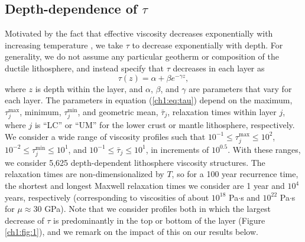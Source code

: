 \subsection{Depth-dependence of $\tau$}
Motivated by the fact that effective viscosity decreases exponentially
with increasing temperature \citep[e.g.,][]{Kohlstedt1995}, we take
$\tau$ to decrease exponentially with depth. For generality, we do not
assume any particular geotherm or composition of the ductile
lithosphere, and instead specify that $\tau$ decreases in each layer
as
\begin{equation}
\tau(z) = \alpha + \beta e^{-\gamma z},
\label{ch1:eq:tau}
\end{equation}
where $z$ is depth within the layer, and $\alpha$, $\beta$, and
$\gamma$ are parameters that vary for each layer.  The parameters in
equation (\ref{ch1:eq:tau}) depend on the maximum, $\tau_j^{\max}$,
minimum, $\tau_j^{\min}$, and geometric mean, $\bar{\tau}_j$,
relaxation times within layer $j$, where $j$ is ``LC'' or ``UM'' for
the lower crust or mantle lithosphere, respectively.  We consider a
wide range of viscosity profiles such that $10^{-1} \leq \tau_j^{\max}
\leq 10^{2}$, $10^{-2} \leq \tau_j^{\min} \leq 10^{1}$, and $10^{-1}
\leq \bar{\tau}_j \leq 10^{1}$, in increments of $10^{0.5}$.  With
these ranges, we consider 5,625 depth-dependent lithosphere viscosity
structures. The relaxation times are non-dimensionalized by $T$, so
for a 100 year recurrence time, the shortest and longest Maxwell
relaxation times we consider are 1 year and $10^{4}$ years,
respectively (corresponding to viscosities of about $10^{18}$
Pa$\cdot$s and $10^{22}$ Pa$\cdot$s for $\mu \approx 30$ GPa).  Note
that we consider profiles both in which the largest decrease of $\tau$
is predominantly in the top or bottom of the layer (Figure
\ref{ch1:fig:1}), and we remark on the impact of this on our results
below.

